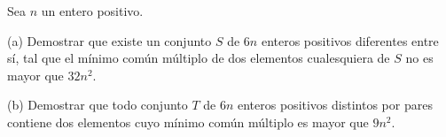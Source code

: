 Sea $n$ un entero positivo.

(a) Demostrar que existe un conjunto $S$ de $6n$ enteros positivos diferentes entre sí, tal que el mínimo común múltiplo de dos elementos cualesquiera de $S$ no es mayor que $32n^2$.

(b) Demostrar que todo conjunto $T$ de $6n$ enteros positivos distintos por pares contiene dos elementos cuyo mínimo común múltiplo es mayor que $9n^2$.